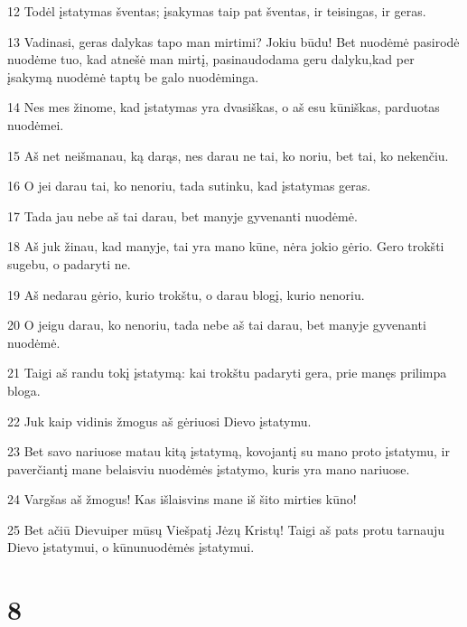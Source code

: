 \par 12 Todėl įstatymas šventas; įsakymas taip pat šventas, ir teisingas, ir geras. 
\par 13 Vadinasi, geras dalykas tapo man mirtimi? Jokiu būdu! Bet nuodėmė pasirodė nuodėme tuo, kad atnešė man mirtį, pasinaudodama geru dalyku,­kad per įsakymą nuodėmė taptų be galo nuodėminga. 
\par 14 Nes mes žinome, kad įstatymas yra dvasiškas, o aš esu kūniškas, parduotas nuodėmei. 
\par 15 Aš net neišmanau, ką darąs, nes darau ne tai, ko noriu, bet tai, ko nekenčiu. 
\par 16 O jei darau tai, ko nenoriu, tada sutinku, kad įstatymas geras. 
\par 17 Tada jau nebe aš tai darau, bet manyje gyvenanti nuodėmė. 
\par 18 Aš juk žinau, kad manyje, tai yra mano kūne, nėra jokio gėrio. Gero trokšti sugebu, o padaryti­ ne. 
\par 19 Aš nedarau gėrio, kurio trokštu, o darau blogį, kurio nenoriu. 
\par 20 O jeigu darau, ko nenoriu, tada nebe aš tai darau, bet manyje gyvenanti nuodėmė. 
\par 21 Taigi aš randu tokį įstatymą: kai trokštu padaryti gera, prie manęs prilimpa bloga. 
\par 22 Juk kaip vidinis žmogus aš gėriuosi Dievo įstatymu. 
\par 23 Bet savo nariuose matau kitą įstatymą, kovojantį su mano proto įstatymu, ir paverčiantį mane belaisviu nuodėmės įstatymo, kuris yra mano nariuose. 
\par 24 Vargšas aš žmogus! Kas išlaisvins mane iš šito mirties kūno! 
\par 25 Bet ačiū Dievui­per mūsų Viešpatį Jėzų Kristų! Taigi aš pats protu tarnauju Dievo įstatymui, o kūnu­nuodėmės įstatymui.


\chapter{8}


